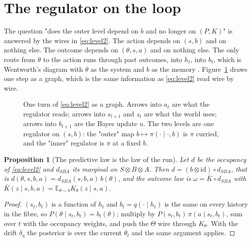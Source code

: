 \documentclass[10pt]{article}
\theoremstyle{plain}
\newtheorem{proposition}{Proposition}
\newcommand{\E}{\mathbb E}
\newcommand{\Kb}{\bar K}
\newcommand{\id}{\mathrm{id}}
\begin{document}
\section{The regulator on the loop}
\label{sec:belief}

The question "does the outer level depend on $b$ and no longer on $(P,K)$" is answered by the wires in \eqref{eq:level2}.
The action depends on $(s,b)$ and on nothing else.
The outcome depends on $(\theta,s,a)$ and on nothing else.
The only route from $\theta$ to the action runs through past outcomes, into $h_t$, into $b_t$, which is Wentworth's diagram with $\theta$ as the system and $b$ as the memory \citep{Wentworth-fixing21}.
Figure~\ref{fig:wires} draws one step as a graph, which is the same information as \eqref{eq:level2} read wire by wire.

\begin{figure}[h]
\centering
{}
\caption{One turn of \eqref{eq:level2} as a graph.
Arrows into $a_t$ are what the regulator reads; arrows into $s_{t+1}$ and $z_t$ are what the world uses; arrows into $b_{t+1}$ are the Bayes update $u$.
The two levels are one regulator on $(s,b)$: the "outer" map $b \mapsto \pi(\cdot \mid \cdot, b)$ is $\pi$ curried, and the "inner" regulator is $\pi$ at a fixed $b$.}
\label{fig:wires}
\end{figure}

\begin{proposition}[The predictive law is the law of the run]
\label{prop:run}
Let $d$ be the occupancy of \eqref{eq:level2} and $d_{SBA}$ its marginal on $S \otimes B \otimes A$.
Then $d = (b \otimes \id) \circ d_{SBA}$, that is $d(\theta,s,b,a) = d_{SBA}(s,b,a)\, b(\theta)$, and the outcome law is $\omega = \Kb \circ d_{SBA}$ with $\Kb(z \mid s,b,a) = \E_{\theta \sim b} K_\theta(z \mid s,a)$.
\end{proposition}
\begin{proof}
$(s_t,b_t)$ is a function of $h_t$ and $b_t = q(\cdot \mid h_t)$ is the same on every history in the fibre, so $P(\theta \mid s_t,b_t) = b_t(\theta)$; multiply by $P(s_t,b_t)\,\pi(a \mid s_t,b_t)$, sum over $t$ with the occupancy weights, and push the $\Theta$ wire through $K_\theta$.
With the drift $\delta_\eta$ the posterior is over the current $\theta_t$ and the same argument applies.
\end{proof}
\end{document}
